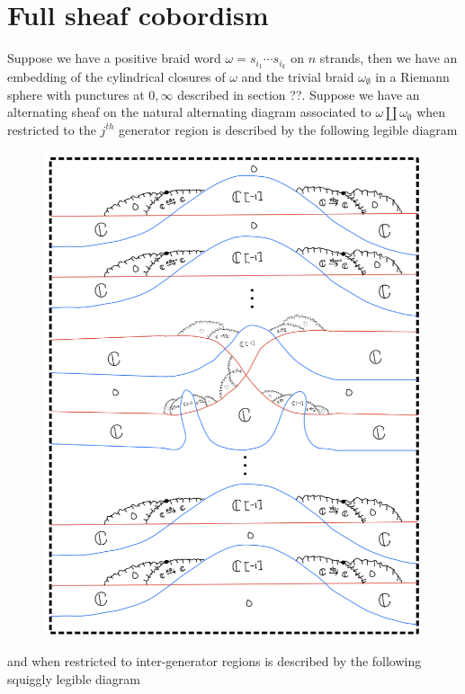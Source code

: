\section{Full sheaf cobordism}
Suppose we have a positive braid word $\omega = s_{i_1}\cdots s_{i_k}$ on $n$ strands, then we have an embedding of the cylindrical closures of $\omega$ and the trivial braid $\omega_{\emptyset}$ in a Riemann sphere with punctures at $0,\infty$ described in section ??. Suppose we have an alternating sheaf on the natural alternating diagram associated to $\omega \coprod \omega_\emptyset$ when restricted to the $j^{th}$ generator region is described by the following legible diagram
\begin{figure}[H]
    \centering
    \includegraphics[scale = 0.95]{diagrams/cobord_full/1.png}
    \caption{}
    \label{fig:your-label}
\end{figure}
and when restricted to inter-generator regions is described by the following squiggly legible diagram
